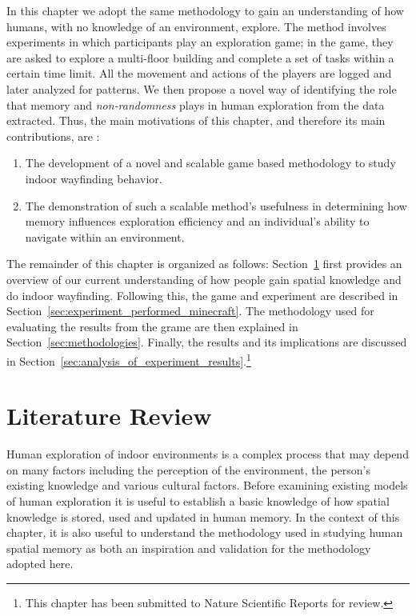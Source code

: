 In this chapter we adopt the same methodology to gain an understanding of how humans, with no knowledge of an environment, explore. The method involves experiments in which participants play an exploration game; in the game, they are asked to explore a multi-floor building and complete a set of tasks within a certain time limit. All the movement and actions of the players are logged and later analyzed for patterns. We then propose a novel way of identifying the role that memory and {\em non-randomness} plays in human exploration from the data extracted.
Thus, the main motivations of this chapter, and therefore its main contributions, are :
\begin{enumerate}
\item The development of a novel and scalable game based methodology to study indoor wayfinding behavior.
\item The demonstration of such a scalable method's usefulness in determining how memory influences exploration efficiency and an individual's ability to navigate within an environment.
\end{enumerate}

The remainder of this chapter is organized as follows: Section~\ref{sec:literature_review} first provides an overview of our current understanding of how people gain spatial knowledge and do indoor wayfinding. Following this, the game and experiment are described in Section~\ref{sec:experiment_performed_minecraft}. The methodology used for evaluating the results from the grame are then explained in Section~\ref{sec:methodologies}. Finally, the results and its implications are discussed in Section~\ref{sec:analysis_of_experiment_results}.\footnote{This chapter has been submitted to Nature Scientific Reports for review.}

\section{Literature Review} %
\label{sec:literature_review}


Human exploration of indoor environments is a complex process that may depend on many factors including the perception of the environment, the person's existing knowledge and various cultural factors. Before examining existing models of human exploration it is useful to establish a basic knowledge of how spatial knowledge is stored, used and updated in human memory. In the context of this chapter, it is also useful to understand the methodology used in studying human spatial memory as both an inspiration and validation for the methodology adopted here.

